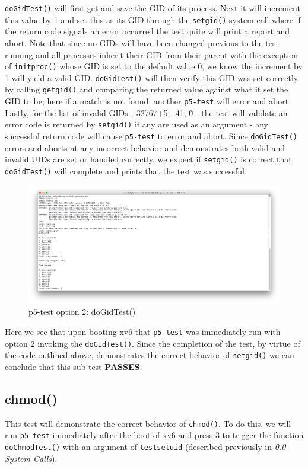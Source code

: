 \documentclass[11pt,letterpaper]{report}
\begin{document}
	{\tt doGidTest()} will first get and save the GID of its process. Next it will increment this value by 1 and set this as its GID through the {\tt setgid()} system call where if the return code 
	signals an error occurred the test quite will print a report and abort. Note that since no GIDs will have been changed previous to the test running and all processes inherit their GID from their parent with the exception
	of {\tt initproc()} whose GID is set to the default value 0, we know the increment by 1 will yield a valid GID.
	{\tt doGidTest()} will then verify this GID was set correctly by calling {\tt getgid()} and comparing the returned value against
	what it set the GID to be; here if a match is not found, another {\tt p5-test} will error and abort. Lastly, for the list of invalid GIDs -  32767+5, -41, \~0 - the test will validate an error code is returned
	by {\tt setgid()} if any are used as an argument - any successful return code will cause {\tt p5-test} to error and abort. Since {\tt doGidTest()} errors and aborts at any incorrect behavior and demonstrates both 
	valid and invalid UIDs are set or handled correctly, we expect if {\tt setgid()} is correct that {\tt doGidTest()} will complete and prints that the test was successful.

\begin{figure}[h!]
\centering
\includegraphics[width=0.8\linewidth]{dogidtest.png}
\caption{p5-test option 2: doGidTest()}
\label{fig:datetest}
\end{figure}

	Here we see that upon booting xv6 that {\tt p5-test} was immediately run with option 2 invoking the {\tt doGidTest()}. Since the completion of the test, by virtue of the code outlined above, demonstrates
	the correct behavior of {\tt setgid()} we can conclude that this sub-test \textbf{PASSES}.

	
	\subsection{chmod()}
	This test will demonstrate the correct behavior of {\tt chmod()}. To do this, we will run {\tt p5-test} immediately after the boot of xv6 
	and press 3 to trigger the function {\tt doChmodTest()} with an argument of 
	{\tt testsetuid} (described previously in \emph{0.0 System Calls}). 
	
\end{document}
